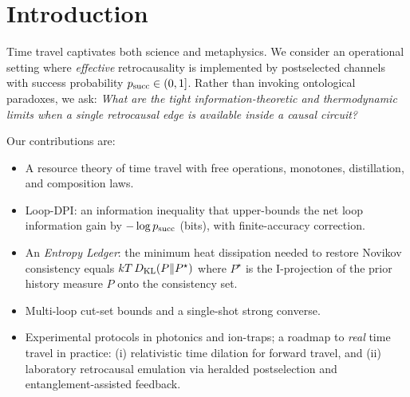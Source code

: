 
\section{Introduction}
Time travel captivates both science and metaphysics. We consider an operational setting where \emph{effective} retrocausality is implemented by postselected channels with success probability $p_{\mathrm{succ}}\in(0,1]$. Rather than invoking ontological paradoxes, we ask: \emph{What are the tight information-theoretic and thermodynamic limits when a single retrocausal edge is available inside a causal circuit?}

Our contributions are:
\begin{itemize}[leftmargin=*,itemsep=0.2em]
    \item A resource theory of time travel with free operations, monotones, distillation, and composition laws.
    \item Loop-DPI: an information inequality that upper-bounds the net loop information gain by $-\log p_{\mathrm{succ}}$ (bits), with finite-accuracy correction.
    \item An \emph{Entropy Ledger}: the minimum heat dissipation needed to restore Novikov consistency equals $kT\,D_{\mathrm{KL}}(P\Vert P^\star)$ where $P^\star$ is the I-projection of the prior history measure $P$ onto the consistency set.
    \item Multi-loop cut-set bounds and a single-shot strong converse.
    \item Experimental protocols in photonics and ion-traps; a roadmap to \emph{real} time travel in practice: (i) relativistic time dilation for forward travel, and (ii) laboratory retrocausal emulation via heralded postselection and entanglement-assisted feedback.
\end{itemize}
